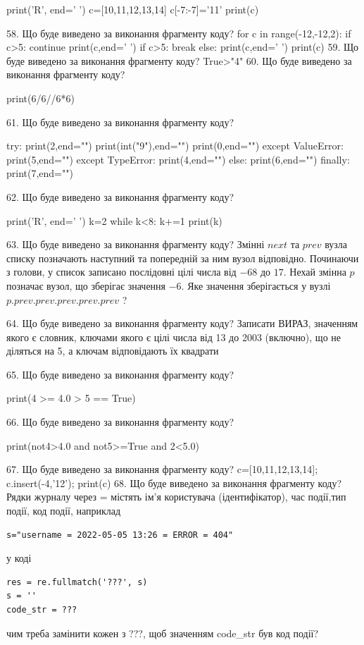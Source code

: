 \documentclass[11pt]{article}
\begin{document}
print('R', end=' ')
c=[10,11,12,13,14]
c[-7:-7]='11'
print(c)


58. Що буде виведено за виконання фрагменту коду?
for c in range(-12,-12,2):
     if c>5: continue
     print(c,end=' ')
     if c>5: break
   else: print(c,end=' ')
   print(c)
59. Що буде виведено за виконання фрагменту коду?
True>"4"
60. Що буде виведено за виконання фрагменту коду?

print(6/6//6*6)

61. Що буде виведено за виконання фрагменту коду?

try:
    print(2,end="")
    print(int("9"),end="")
    print(0,end="")
except ValueError: print(5,end="")
except TypeError: print(4,end="")
else: print(6,end="")
finally: print(7,end="")


62. Що буде виведено за виконання фрагменту коду?

print('R', end=' ')
k=2
while k<8:
    k+=1
print(k)


63. Що буде виведено за виконання фрагменту коду?
Змінні $next$ та $prev$ вузла списку позначають наступний та попередній за ним вузол відповідно. Починаючи з голови, у список записано послідовні цілі числа від $-68$ до $17$. Нехай змінна $p$ позначає вузол, що зберігає значення $-6$.
Яке значення зберігається у вузлі $p.prev.prev.prev.prev.prev$ ?

64. Що буде виведено за виконання фрагменту коду?
Записати ВИРАЗ, значенням якого є словник, ключами якого є цілі числа від 13 до 2003 (включно), що не діляться на 5, а ключам відповідають їх квадрати 

65. Що буде виведено за виконання фрагменту коду?

print(4 >= 4.0 > 5 == True)

66. Що буде виведено за виконання фрагменту коду?

print(not4>4.0 and not5>=True and 2<5.0)

67. Що буде виведено за виконання фрагменту коду?
c=[10,11,12,13,14]; c.insert(-4,'12'); print(c)
68. Що буде виведено за виконання фрагменту коду?
Рядки журналу через = містять ім'я користувача (ідентифікатор), час події,тип події, код події, наприклад
\begin{verbatim}
s="username = 2022-05-05 13:26 = ERROR = 404"
\end{verbatim}
у коді 
\begin{verbatim}
res = re.fullmatch('???', s) 
s = ''
code_str = ??? 
\end{verbatim}
чим треба замінити кожен з ???, щоб значенням code\_str був код події? 
\end{document}
